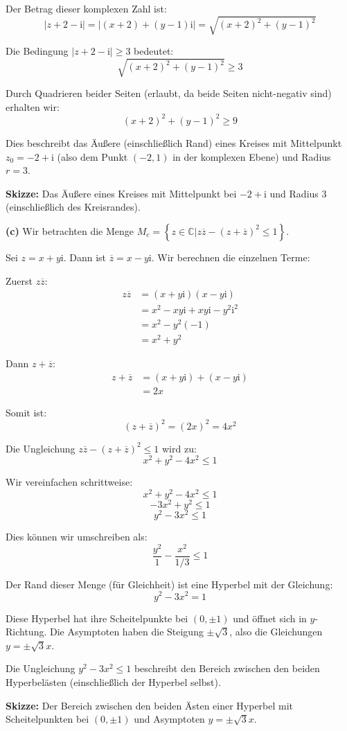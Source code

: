 \documentclass{article}
\newcommand{\im}{\mathrm{i}}
\newcommand{\C}{\mathbb{C}}
\newcommand{\abs}[1]{\left|#1\right|}
\newcommand{\conj}[1]{\overline{#1}}
\newcommand{\Set}[1]{\left\{#1\right\}}
\begin{document}
Der Betrag dieser komplexen Zahl ist:
$$\abs{z + 2 - \im} = \abs{(x + 2) + (y - 1)\im} = \sqrt{(x + 2)^2 + (y - 1)^2}$$

Die Bedingung $\abs{z + 2 - \im} \geq 3$ bedeutet:
$$\sqrt{(x + 2)^2 + (y - 1)^2} \geq 3$$

Durch Quadrieren beider Seiten (erlaubt, da beide Seiten nicht-negativ sind) erhalten wir:
$$(x + 2)^2 + (y - 1)^2 \geq 9$$

Dies beschreibt das Äußere (einschließlich Rand) eines Kreises mit Mittelpunkt $z_0 = -2 + \im$ (also dem Punkt $(-2, 1)$ in der komplexen Ebene) und Radius $r = 3$.

\textbf{Skizze:} Das Äußere eines Kreises mit Mittelpunkt bei $-2 + \im$ und Radius $3$ (einschließlich des Kreisrandes).

\textbf{(c)} Wir betrachten die Menge $M_c = \Set{ z \in \C | z \conj{z} - (z + \conj{z} )^2 \leq 1 }$.

Sei $z = x + y\im$. Dann ist $\conj{z} = x - y\im$. Wir berechnen die einzelnen Terme:

Zuerst $z \conj{z}$:
\begin{align}
z \conj{z} &= (x + y\im)(x - y\im) \\
&= x^2 - xy\im + xy\im - y^2\im^2 \\
&= x^2 - y^2(-1) \\
&= x^2 + y^2
\end{align}

Dann $z + \conj{z}$:
\begin{align}
z + \conj{z} &= (x + y\im) + (x - y\im) \\
&= 2x
\end{align}

Somit ist:
$$(z + \conj{z})^2 = (2x)^2 = 4x^2$$

Die Ungleichung $z \conj{z} - (z + \conj{z} )^2 \leq 1$ wird zu:
$$x^2 + y^2 - 4x^2 \leq 1$$

Wir vereinfachen schrittweise:
$$x^2 + y^2 - 4x^2 \leq 1$$
$$-3x^2 + y^2 \leq 1$$
$$y^2 - 3x^2 \leq 1$$

Dies können wir umschreiben als:
$$\frac{y^2}{1} - \frac{x^2}{1/3} \leq 1$$

Der Rand dieser Menge (für Gleichheit) ist eine Hyperbel mit der Gleichung:
$$y^2 - 3x^2 = 1$$

Diese Hyperbel hat ihre Scheitelpunkte bei $(0, \pm 1)$ und öffnet sich in $y$-Richtung. Die Asymptoten haben die Steigung $\pm\sqrt{3}$, also die Gleichungen $y = \pm\sqrt{3}x$.

Die Ungleichung $y^2 - 3x^2 \leq 1$ beschreibt den Bereich zwischen den beiden Hyperbelästen (einschließlich der Hyperbel selbst).

\textbf{Skizze:} Der Bereich zwischen den beiden Ästen einer Hyperbel mit Scheitelpunkten bei $(0, \pm 1)$ und Asymptoten $y = \pm\sqrt{3}x$.
\end{document}
